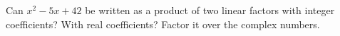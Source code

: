 Can $x^2-5x+42$ be written as a product of two linear factors with integer coefficients? With real coefficients? Factor it over the complex numbers.
